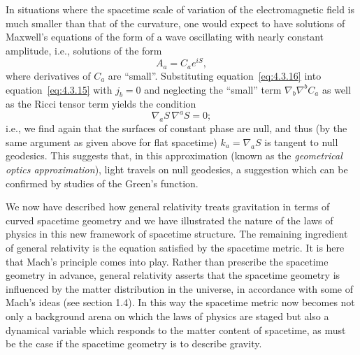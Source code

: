In situations where the spacetime scale of variation of the electromagnetic field
is much smaller than that of the curvature, one would expect to have solutions of
Maxwell's equations of the form of a wave oscillating with nearly constant
amplitude, i.e., solutions of the form
\begin{equation}
  A_a=C_ae^{iS} ,
  \tag{4.3.16}\label{eq:4.3.16}
\end{equation}
where derivatives of \(C_a\) are \textquotedblleft small\textquotedblright.
Substituting equation~\eqref{eq:4.3.16} into equation~\eqref{eq:4.3.15}
with \(j_b=0\) and neglecting the \textquotedblleft small\textquotedblright{}
term \(\nabla_b\nabla^bC_a\) as well as the Ricci tensor term yields the
condition
\begin{equation}
  \nabla_aS\,\nabla^aS=0 ;
  \tag{4.3.17}\label{eq:4.3.17}
\end{equation}
i.e., we find again that the surfaces of constant phase are null, and thus (by the
same argument as given above for flat spacetime) \(k_a=\nabla_aS\) is tangent
to null geodesics. This suggests that, in this approximation (known as the
\emph{geometrical optics approximation}), light travels on null geodesics, a
suggestion which can be confirmed by studies of the Green's function.

We now have described how general relativity treats gravitation in terms of curved
spacetime geometry and we have illustrated the nature of the laws of physics in this
new framework of spacetime structure. The remaining ingredient of general
relativity is the equation satisfied by the spacetime metric. It is here that Mach's
principle comes into play. Rather than prescribe the spacetime geometry in advance,
general relativity asserts that the spacetime geometry is influenced by the matter
distribution in the universe, in accordance with some of Mach's ideas (see section
1.4). In this way the spacetime metric now becomes not only a background arena
on which the laws of physics are staged but also a dynamical variable which
responds to the matter content of spacetime, as must be the case if the spacetime
geometry is to describe gravity.

